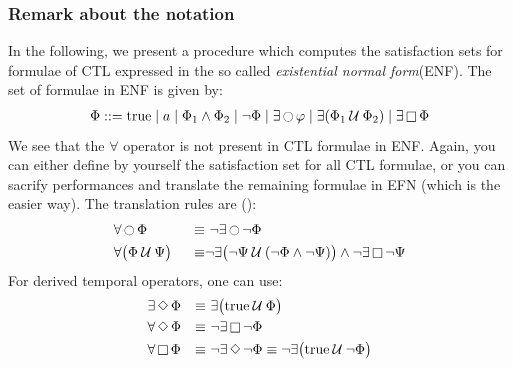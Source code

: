 \documentclass{article}
\begin{document}
\subsubsection{Remark about the notation}
In the following, we present a procedure which computes the satisfaction sets for formulae of 
CTL expressed in the so called \emph{existential normal form}(ENF). The set of formulae in ENF is given by: 
\begin{align*}
    & \Phi ::= \text{true} \mid a \mid \Phi_1 \land \Phi_2 \mid \neg \Phi \mid \exists \mathop{\ocircle}{\varphi} \mid \exists (\Phi_1 \mathbin{\mathcal{U}} \Phi_2) \mid \exists \mathop{\square} \Phi \\
\end{align*}
We see that the $\forall$ operator is not present in CTL formulae in ENF.
Again, you can either define by yourself the satisfaction set for all CTL formulae, or you can sacrify performances and translate the remaining formulae in EFN (which is the easier way).
The translation rules are (\cite[Paragraph 6.2.4]{BaKa}):
\begin{align*}
    & \forall \mathop{\ocircle}{\Phi} & \equiv & \text{ } \neg \exists \mathop{\ocircle}{\neg \Phi} \\
    & \forall \big( \Phi \mathbin{\mathcal{U}} \Psi \big) & \text{ } \equiv & \neg \exists \big( \neg \Psi \mathbin{\mathcal{U}} (\neg \Phi \land \neg \Psi) \big) \land \neg \exists \mathop{\square} \neg \Psi \\
\end{align*}
For derived temporal operators, one can use:
\begin{align*}
    & \exists \mathop{\Diamond} \Phi & \equiv & \text{ } \exists \big(\text{true} \mathbin{\mathcal{U}} \Phi\big) \\
    & \forall \mathop{\Diamond} \Phi & \equiv  & \text{ }\neg \exists \mathop{\square} \neg \Phi \\ 
    & \forall \mathop{\square} \Phi & \equiv & \text{ } \neg \exists \mathop{\Diamond} \neg \Phi \equiv \neg \exists \big(\text{true} \mathbin{\mathcal{U}} \neg \Phi \big) \\
\end{align*}
\end{document}
